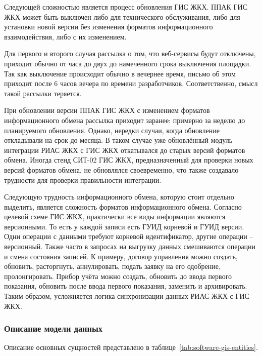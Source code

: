 Следующей сложностью является процесс обновления ГИС ЖКХ.
ППАК ГИС ЖКХ может быть выключен либо для технического обслуживания, либо для установки новой версии без изменения форматов информационного взаимодействия, либо с их изменением.

Для первого и второго случая рассылка о том, что веб-сервисы будут отключены, приходит обычно от часа до двух до намеченного срока выключения площадки.
Так как выключение происходит обычно в вечернее время, письмо об этом приходит после 6 часов вечера по времени разработчиков.
Соответственно, смысл такой рассылки теряется.

При обновлении версии ППАК ГИС ЖКХ с изменением форматов информационного обмена рассылка приходит заранее: примерно за неделю до планируемого обновления.
Однако, нередки случаи, когда обновление откладывали на срок до месяца.
В таком случае уже обновлённый модуль интеграции РИАС ЖКХ с ГИС ЖКХ откатывался до старых версий форматов обмена.
Иногда стенд СИТ-02 ГИС ЖКХ, предназначенный для проверки новых версий форматов обмена, не обновлялся своевременно, что также создавало трудности для проверки правильности интеграции.

Следующую трудность информационного обмена, которую стоит отдельно выделить, является сложность форматов информационного обмена.
Согласно целевой схеме ГИС ЖКХ, практически все виды информации являются версионными.
То есть у каждой записи есть ГУИД корневой и ГУИД версии.
Одни операции с данными требуют корневой идентификатор, другие операции -- версионный.
Также часто в запросах на выгрузку данных смешиваются операции и смена состояния записей.
К примеру, договор управления можно создать, обновить, расторгнуть, аннулировать, подать заявку на его одобрение, пролонгировать.
Прибор учёта можно создать, обновить до ввода первого показания, обновить после ввода первого показания, заменить и архивировать.
Таким образом, усложняется логика синхронизации данных РИАС ЖКХ с ГИС ЖКХ.

\subsubsection{Описание модели данных}
\label{head:software-gis-entities}

Описание основных сущностей представлено в таблице~\ref{tab:software-gis-entities}.

